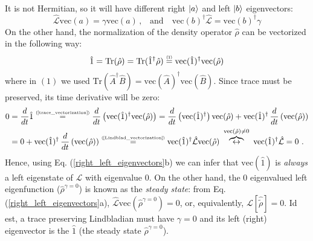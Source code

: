 \documentclass[11pt]{article}
\numberwithin{equation}{section} %
\numberwithin{figure}{section} %
\newcommand\numeq[1] %
  {\stackrel{\scriptscriptstyle(\mkern-1.5mu#1\mkern-1.5mu)}{=}}
\begin{document}
\begin{appendices}
It is not Hermitian, so it will have different right $\ket{a}$ and left $\ket{b}$ eigenvectors:
\begin{equation} \label{right_left_eigenvectors}
\hat{\mathcal{L}}\textrm{vec}(a)=\gamma\textrm{vec}(a)\,\textrm{,}\quad\textrm{and}\quad\textrm{vec}(b)^\dagger\hat{\mathcal{L}}=\textrm{vec}(b)^\dagger\gamma
\end{equation}
On the other hand,  the normalization of the density operator $\hat{\rho}$ can be vectorized in the following way:
\begin{equation} \label{trace_vectorization}
\hat{1}=\textrm{Tr}(\hat{\rho})=\textrm{Tr}(\hat{1}^\dagger\hat{\rho})\numeq{1}\textrm{vec}(\hat{1})^\dagger\textrm{vec}(\hat{\rho})
\end{equation}
where in $(1)$ we used $\textrm{Tr}(\hat{A}^\dagger\hat{B})=\textrm{vec}(\hat{A})^\dagger\textrm{vec}(\hat{B})$. Since trace must be preserved, its time derivative will be zero:
\begin{equation} \label{Liouvillian_zero_eigenval}
\begin{split}
0 
&= \frac{d}{dt} \hat{1}\numeq{\textrm{\ref{trace_vectorization}}} \frac{d}{dt} \left( \textrm{vec}(\hat{1})^\dagger\textrm{vec}(\hat{\rho}) \right) = \frac{d}{dt} \left( \textrm{vec}(\hat{1})^\dagger\right) \textrm{vec}(\hat{\rho})  + \textrm{vec}(\hat{1})^\dagger\,\frac{d}{dt} \left( \textrm{vec}(\hat{\rho})\right)\\
&=  0 + \textrm{vec}(\hat{1})^\dagger\,\frac{d}{dt} \left( \textrm{vec}(\hat{\rho})\right) \numeq{\textrm{\ref{Lindblad_vectorization}}} \textrm{vec}(\hat{1})^\dagger \hat{\mathcal{L}}\textrm{vec}(\hat{\rho}) \,\, \overbrace{\leftrightarrow}^{\textrm{vec}(\hat{\rho})\neq 0} \,\, \textrm{vec}(\hat{1})^\dagger \hat{\mathcal{L}} = 0 \,\,\textrm{.}
\end{split} 
\end{equation}
Hence, using Eq. (\ref{right_left_eigenvectors}b) we can infer that $\textrm{vec}(\hat{1})$ is \emph{always} a left eigenstate of $\mathcal{L}$ with eigenvalue 0. On the other hand, the 0 eigenvalued left eigenfunction ($\hat{\rho}^{\gamma=0}$) is known as the \emph{steady state}: from Eq. (\ref{right_left_eigenvectors}a), $\hat{\mathcal{L}}\textrm{vec}(\hat{\rho}^{\gamma=0})=0$, or, equivalently, $\mathcal{L}[\hat{\tilde{\rho}}]=0$. Id est, a trace preserving Lindbladian must have $\gamma=0$ and its left (right) eigenvector is the $\hat{1}$ (the steady state $\hat{\rho}^{\gamma=0}$).


\end{appendices}
\end{document}

